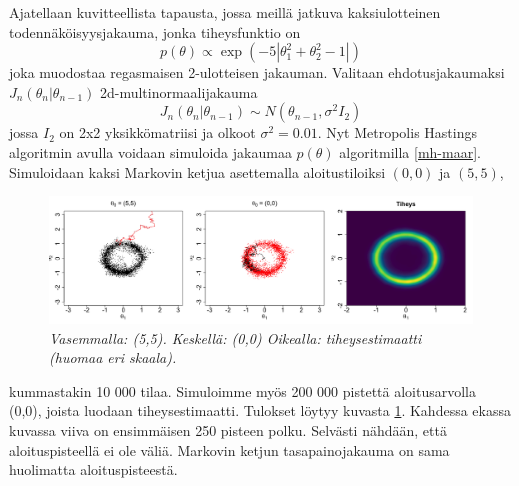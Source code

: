 \begin{esim}\label{mh-esim1}
	Ajatellaan kuvitteellista tapausta, jossa meillä jatkuva kaksiulotteinen todennäköisyysjakauma, jonka tiheysfunktio on 
	\begin{equation}
		p(\theta) \varpropto \exp(-5 |\theta_1^2+\theta_2^2-1|)
	\end{equation}
	joka muodostaa regasmaisen 2-ulotteisen jakauman. Valitaan ehdotusjakaumaksi $J_n(\theta_n|\theta_{n-1})$ 2d-multinormaalijakauma 
	\begin{equation}
		J_n(\theta_n|\theta_{n-1}) \sim N(\theta_{n-1}, \sigma^2 I_2)
	\end{equation}
	jossa $I_2$ on 2x2 yksikkömatriisi ja olkoot $\sigma^2 = 0.01$. Nyt Metropolis Hastings algoritmin avulla voidaan simuloida jakaumaa $p(\theta)$ algoritmilla \ref{mh-maar}. Simuloidaan kaksi Markovin ketjua asettemalla aloitustiloiksi $(0,0)$ ja $(5,5)$, 
	\begin{figure}[h!]
		\includegraphics[width=\textwidth]{mhexample1}
		\caption[Kaksiulotteinen Metropolis--Hastings esimerkki]{\textit{Vasemmalla: (5,5). Keskellä: (0,0) Oikealla: tiheysestimaatti (huomaa eri skaala).}}
		\label{kuva1}
	\end{figure}
	kummastakin 10 000 tilaa. Simuloimme myös 200 000 pistettä aloitusarvolla (0,0), joista luodaan tiheysestimaatti. Tulokset löytyy kuvasta \ref{kuva1}. Kahdessa ekassa kuvassa viiva on ensimmäisen 250 pisteen polku. Selvästi nähdään, että aloituspisteellä ei ole väliä. Markovin ketjun tasapainojakauma on sama huolimatta aloituspisteestä.
	
\end{esim}

